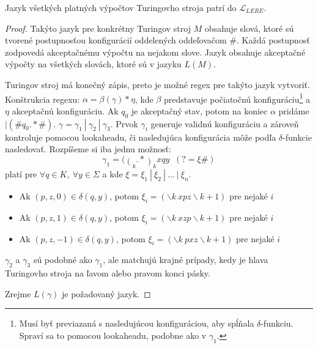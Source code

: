 \documentclass{svk_long_sk}
\def\lel{\mathscr{L}_{LERE}}
\begin{document}
\begin{theorem}
Jazyk všetkých platných výpočtov Turingovho stroja patrí do $\lel$.
\end{theorem}
\begin{proof}
Takýto jazyk pre konkrétny Turingov stroj $M$ obsahuje slová, ktoré sú tvorené postupnosťou konfigurácií oddelených oddeľovačom \#. Každá postupnosť zodpovedá akceptačnému výpočtu na nejakom slove. Jazyk obsahuje akceptačné výpočty na všetkých slovách, ktoré sú v jazyku $L(M)$.

Turingov stroj má konečný zápis, preto je možné regex pre takýto jazyk vytvoriť. Konštrukcia regexu: $\alpha = \beta(\gamma)*\eta$, kde $\beta$ predstavuje počiatočnú konfiguráciu\footnote{Musí byť previazaná s nasledujúcou konfiguráciou, aby spĺňala $\delta$-funkciu. Spraví sa to pomocou lookaheadu, podobne ako v $\gamma_1$.} a $\eta$ akceptačnú konfiguráciu. Ak $q_0$ je akceptačný stav, potom na koniec $\alpha$ pridáme $|(\#q_0.*\#)$. $\gamma = \gamma_1~|~\gamma_2~|~\gamma_3$.	Prvok $\gamma_i$ generuje validnú konfiguráciu a zároveň kontroluje pomocou lookaheadu, či nasledujúca konfigurácia môže podľa $\delta$-funkcie nasledovať. Rozpíšeme si iba jednu možnosť: 
 $$ \displaystyle \gamma_1=(\mathop(_k.*\mathop)_k x q y \mathop(_{k+1} .* \mathop)_{k+1} \#)(?= \xi \#)$$ platí pre $\forall q \in K,~\forall y \in \Sigma$ a kde $ \xi = \xi_1 ~|~ \xi_2 ~|~ \dots ~|~ \xi_n $.
\begin{itemize}
\item Ak $ (p,z,0) \in \delta(q,y)$, potom $\xi_i = (\backslash k~x p z \backslash k+1)$ pre nejaké $i$
\item Ak $ (p,z,1) \in \delta(q,y)$, potom $\xi_i = (\backslash k~x z p \backslash k+1)$ pre nejaké $i$
\item Ak $ (p,z,-1) \in \delta(q,y)$, potom $\xi_i = (\backslash k~p x z \backslash k+1)$ pre nejaké $i$
\end{itemize}

$\gamma_2$ a $\gamma_3$ sú podobné ako $\gamma_1$, ale matchujú krajné prípady, kedy je hlava Turingovho stroja na ľavom alebo pravom konci pásky.

Zrejme $L(\gamma)$ je požadovaný jazyk.
\end{proof}
\end{document}
